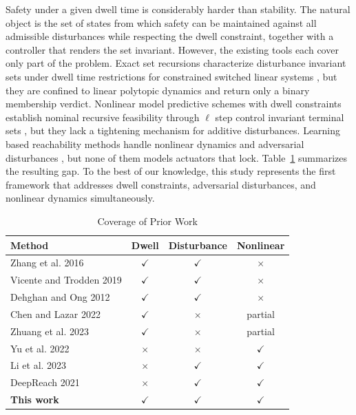 \documentclass[journal]{IEEEtran}
\begin{document}
Safety under a given dwell time is considerably harder than stability. The natural object is the set of states from which safety can be maintained against all admissible disturbances while respecting the dwell constraint, together with a controller that renders the set invariant. However, the existing tools each cover only part of the problem. Exact set recursions characterize disturbance invariant sets under dwell time restrictions for constrained switched linear systems \cite{dehghan2012}, but they are confined to linear polytopic dynamics and return only a binary membership verdict. Nonlinear model predictive schemes with dwell constraints establish nominal recursive feasibility through $\ell$ step control invariant terminal sets \cite{chenlazar2022}, but they lack a tightening mechanism for additive disturbances. Learning based reachability methods handle nonlinear dynamics and adversarial disturbances \cite{fisac2019,yu2022,li2023cdc,bansal2021deepreach}, but none of them models actuators that lock. Table~\ref{tab_gap} summarizes the resulting gap. To the best of our knowledge, this study represents the first framework that addresses dwell constraints, adversarial disturbances, and nonlinear dynamics simultaneously.

\begin{table}[!t]
\renewcommand{\arraystretch}{1.3}
\caption{Coverage of Prior Work}
\label{tab_gap}
\centering
\begin{tabular}{lccc}
\toprule
Method & Dwell & Disturbance & Nonlinear \\
\midrule
Zhang et al. 2016 \cite{zhang2016} & $\checkmark$ & $\checkmark$ & $\times$ \\
Vicente and Trodden 2019 \cite{vicente2019} & $\checkmark$ & $\checkmark$ & $\times$ \\
Dehghan and Ong 2012 \cite{dehghan2012} & $\checkmark$ & $\checkmark$ & $\times$ \\
Chen and Lazar 2022 \cite{chenlazar2022} & $\checkmark$ & $\times$ & partial \\
Zhuang et al. 2023 \cite{zhuang2023} & $\checkmark$ & $\times$ & partial \\
Yu et al. 2022 \cite{yu2022} & $\times$ & $\times$ & $\checkmark$ \\
Li et al. 2023 \cite{li2023cdc} & $\times$ & $\checkmark$ & $\checkmark$ \\
DeepReach 2021 \cite{bansal2021deepreach} & $\times$ & $\checkmark$ & $\checkmark$ \\
\textbf{This work} & $\bm\checkmark$ & $\bm\checkmark$ & $\bm\checkmark$ \\
\bottomrule
\end{tabular}
\end{table}
\end{document}
